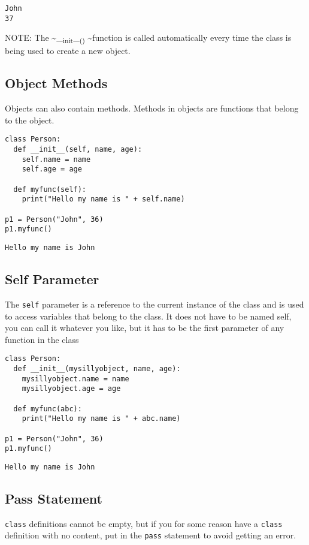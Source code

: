 \documentclass[11pt]{article}
\begin{document}
\begin{verbatim}
John
37
\end{verbatim}



NOTE: The \textasciitilde{}\_\textsubscript{init}\_\textsubscript{()} \textasciitilde{}function is called automatically every time the class is being used to create a new object.

\subsection{Object Methods}
\label{sec:org9690c46}
Objects can also contain methods. Methods in objects are functions that belong to the object.


\begin{verbatim}
class Person:
  def __init__(self, name, age):
    self.name = name
    self.age = age

  def myfunc(self):
    print("Hello my name is " + self.name)

p1 = Person("John", 36)
p1.myfunc() 
\end{verbatim}

\begin{verbatim}
Hello my name is John
\end{verbatim}

\subsection{Self Parameter}
\label{sec:org6c8a43b}
The \texttt{self} parameter is a reference to the current instance of the class and is used to access variables that belong to the class.
It does not have to be named self, you can call it whatever you like, but it has to be the first parameter of any function in the class

\begin{verbatim}
class Person:
  def __init__(mysillyobject, name, age):
    mysillyobject.name = name
    mysillyobject.age = age

  def myfunc(abc):
    print("Hello my name is " + abc.name)

p1 = Person("John", 36)
p1.myfunc() 
\end{verbatim}

\begin{verbatim}
Hello my name is John
\end{verbatim}



\subsection{Pass Statement}
\label{sec:orgdd5196d}
\texttt{class} definitions cannot be empty, but if you for some reason have a \texttt{class} definition with no content, put in the \texttt{pass} statement to avoid getting an error.
\end{document}
